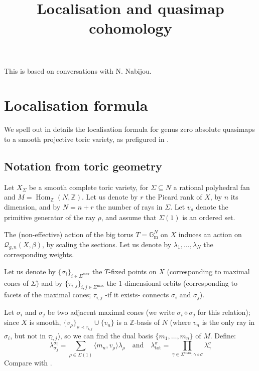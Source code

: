 \documentclass[11pt]{amsart}
\title[]{Localisation and quasimap cohomology}
\author{}
\newcommand{\Q}[4]{\mathcal{Q}_{#1,#2}(#3,#4)}
\newcommand{\Hom}{\operatorname{Hom}}
\newcommand{\Gm}{\mathbb{G}_{\text{m}}}
\newcommand{\ZZ}{\mathbb{Z}}
\theoremstyle{definition}
\theoremstyle{definition}
\begin{document}
\maketitle
\appendixtitletocoff
\tableofcontents

This is based on conversations with N. Nabijou.
\section{Localisation formula}
We spell out in details the localisation formula for genus zero absolute quasimaps to a smooth projective toric variety, as prefigured in \cite[\S 6.2]{CF-K}.
\subsection{Notation from toric geometry}
Let $X_\Sigma$ be a smooth complete toric variety, for $\Sigma\subseteq N$ a rational polyhedral fan and $M=\Hom_{\ZZ}(N,\ZZ)$. Let us denote by $r$ the Picard rank of $X$, by $n$ its dimension, and by $N=n+r$ the number of rays in $\Sigma$. Let $v_\rho$ denote the primitive generator of the ray $\rho$, and assume that $\Sigma(1)$ is an ordered set.

The (non-effective) action of the big torus $T=\Gm^N$ on $X$ induces an action on $\Q{g}{n}{X}{\beta}$, by scaling the sections. Let us denote by $\lambda_1,\ldots,\lambda_N$ the corresponding weights.

Let us denote by $\{\sigma_i\}_{i\in\Sigma^\text{max}}$ the $T$-fixed points on $X$ (corresponding to maximal cones of $\Sigma$) and by $\{\tau_{i,j}\}_{i,j\in\Sigma^\text{max}}$ the $1$-dimensional orbits (corresponding to facets of the maximal cones; $\tau_{i,j}$ -if it exists- connects $\sigma_i$ and $\sigma_j$).

Let $\sigma_i$ and $\sigma_j$ be two adjacent maximal cones (we write $\sigma_i\diamond\sigma_j$ for this relation); since $X$ is smooth, $\{v_\rho\}_{\rho\prec\tau_{i,j}}\cup\{v_n\}$ is a $\ZZ$-basis of $N$ (where $v_n$ is the only ray in $\sigma_i$, but not in $\tau_{i,j}$), so we can find the dual basis $\{m_1,\ldots,m_n\}$ of $M$. Define: \[\lambda^{\sigma_i}_{\sigma_j}=\sum_{\rho\in\Sigma(1)}\langle m_n,v_\rho\rangle\lambda_\rho \quad \text{and} \quad \lambda^{\sigma}_{\text{tot}}=\prod_{\gamma\in\Sigma^{\text{max}}\colon\gamma\diamond\sigma}\lambda^\sigma_\gamma\] Compare with \cite[\S\S 6.4 and 7.3]{HolgerSpielberg}.
\end{document}
